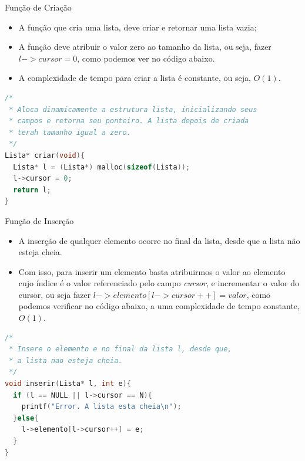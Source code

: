 \begin{frame}[fragile,c]{Função de Criação}
	\begin{itemize}
		\item A função que cria uma lista, deve criar e retornar uma lista vazia;
		\item A função deve atribuir o valor zero ao tamanho da lista, ou seja, fazer $l->cursor = 0$, como podemos ver no código abaixo.
		\item A complexidade de tempo para criar a lista é constante, ou seja, $O(1)$.
	\end{itemize}
\begin{lstlisting}[language=C]
/*
 * Aloca dinamicamente a estrutura lista, inicializando seus
 * campos e retorna seu ponteiro. A lista depois de criada
 * terah tamanho igual a zero.
 */
Lista* criar(void){
  Lista* l = (Lista*) malloc(sizeof(Lista));
  l->cursor = 0;
  return l;
}
\end{lstlisting}
\end{frame}

\begin{frame}[fragile,c]{Função de Inserção}  
	\begin{itemize}
		\item A inserção de qualquer elemento ocorre no final da lista, desde que a lista não esteja cheia.
		\item Com isso, para inserir um elemento basta atribuirmos o valor ao elemento cujo índice é o valor referenciado pelo campo \textit{cursor}, e incrementar o valor do cursor, ou seja fazer $l->elemento[l->cursor++] = valor$, como podemos verificar no código abaixo, a uma complexidade de tempo constante, $O(1)$.
	\end{itemize}

\footnotesize
\begin{lstlisting}[language=C]
/*
 * Insere o elemento e no final da lista l, desde que,
 * a lista nao esteja cheia.
 */
void inserir(Lista* l, int e){
  if (l == NULL || l->cursor == N){
    printf("Error. A lista esta cheia\n");
  }else{
    l->elemento[l->cursor++] = e;
  }
}
\end{lstlisting}	
\end{frame}

